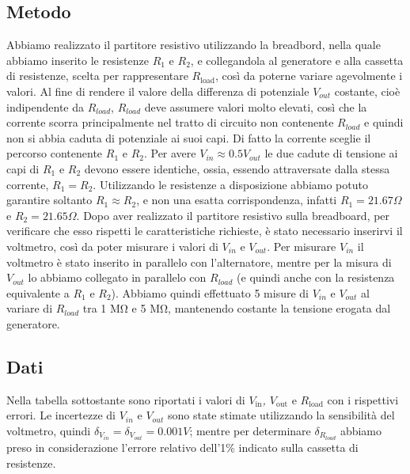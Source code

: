 \documentclass[a4paper]{article}
\begin{document}
\subsection{Metodo}
Abbiamo realizzato il partitore resistivo utilizzando la breadbord, nella quale abbiamo inserito le resistenze \( \mathit{R_1} \) e \( \mathit{R_2} \),
e collegandola al generatore e alla cassetta di resistenze, scelta per rappresentare $R_{\text{load}}$, così da poterne variare agevolmente i valori.
Al fine di rendere il valore della differenza di potenziale \( \mathit{V_{out}} \) costante, cioè indipendente da \( \mathit{R_{\text{load}}} \),
\( \mathit{R_{\text{load}}} \) deve assumere valori molto elevati, così che la corrente scorra principalmente nel tratto di circuito non contenente \( \mathit{R_{\text{load}}} \)
e quindi non si abbia caduta di potenziale ai suoi capi.
Di fatto la corrente sceglie il percorso contenente \( \mathit{R_1} \) e \( \mathit{R_2} \).
Per avere \( \mathit{V_{\text{in}} \approx 0.5V_{\text{out}}} \) le due cadute di tensione ai capi di \( \mathit{R_1} \) e \( \mathit{R_2} \) devono essere identiche, ossia, essendo attraversate dalla stessa corrente, \( \mathit{R_1=R_2} \).
Utilizzando le resistenze a disposizione abbiamo potuto garantire soltanto \( \mathit{R_1\approx R_2} \), e non una esatta corrispondenza, infatti \( \mathit{R_1=21.67 \si{\ohm}} \) e \( \mathit{R_2=21.65 \si{\ohm}} \).
Dopo aver realizzato il partitore resistivo sulla breadboard, per verificare che esso rispetti le caratteristiche richieste, è stato necessario inserirvi il voltmetro,
così da poter misurare i valori di \( \mathit{V_{\text{in}}} \) e \( \mathit{V_{\text{out}}} \). Per misurare \( \mathit{V_{\text{in}}} \) il voltmetro è stato inserito in parallelo con l'alternatore,
mentre per la misura di \( \mathit{V_{\text{out}}} \) lo abbiamo collegato in parallelo con \( \mathit{R_{load}} \) (e quindi anche con la resistenza equivalente a \( \mathit{R_1} \) e \( \mathit{R_2} \)).
Abbiamo quindi effettuato 5 misure di \( \mathit{V_{\text{in}}} \) e \( \mathit{V_{\text{out}}} \) al variare di \( \mathit{R_{\text{load}}} \) tra 1 \(\si{\mega\ohm}\) e 5 \(\si{\mega\ohm}\),  mantenendo costante la tensione erogata dal generatore.
\subsection{Dati}
Nella tabella sottostante sono riportati i valori di \emph{$V_{\text{in}}$, $V_{\text{out}}$} e \emph{$R_{\text{load}}$} con i rispettivi errori.
Le incertezze di \( \mathit{V_{\text{in}}} \) e \( \mathit{V_{\text{out}}} \) sono state stimate utilizzando la sensibilità del voltmetro, quindi \( \mathit{\delta_{V_{\text{in}}}=\delta_{V_{\text{out}}}=0.001 V} \);
mentre per determinare \( \mathit{\delta_{R_{\text{load}}}} \) abbiamo preso in considerazione l'errore relativo dell'1\% indicato sulla cassetta di resistenze.
\end{document}
